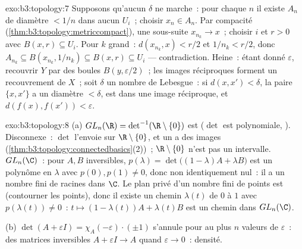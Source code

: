 \begin{solution}{exo:b3:topology:7}
Supposons qu'aucun $\delta$ ne marche~: pour chaque $n$ il
existe $A_n$ de diamètre $< 1/n$  dans aucun $U_i$~;
choisir $x_n \in A_n$. Par compacité
(\cref{thm:b3:topology:metriccompact}), une sous-suite
$x_{n_k} \to x$~; choisir $i$ et $r > 0$ avec $B(x, r)
\subseteq U_i$. Pour $k$ grand~: $d(x_{n_k}, x) < r/2$ et
$1/n_k < r/2$, donc $A_{n_k} \subseteq B(x_{n_k}, 1/n_k)
\subseteq B(x, r) \subseteq U_i$ --- contradiction. Heine~:
étant donné $\varepsilon$, recouvrir $Y$ par des boules
$B(y, \varepsilon/2)$~; les images réciproques forment un
recouvrement  de $X$~; soit $\delta$ un nombre de
Lebesgue~: si $d(x, x') < \delta$, la paire $\{x, x'\}$ a un
diamètre $< \delta$, est dans une image réciproque, et
$d(f(x), f(x')) < \varepsilon$.
\end{solution}

\begin{solution}{exo:b3:topology:8}
(a) $GL_n(\R) = \det^{-1}(\R\setminus\{0\})$ est 
($\det$ est polynomiale, ). Disconnexe~: $\det$
l'envoie sur $\R\setminus\{0\}$, et un  a des
images  
(\cref{thm:b3:topology:connectedbasics}(2))~;
$\R\setminus\{0\}$ n'est pas un intervalle. $GL_n(\C)$~: pour
$A, B$ inversibles, $p(\lambda) = \det\bigl((1-\lambda)A +
\lambda B\bigr)$ est un polynôme en $\lambda$ avec $p(0),
p(1) \neq 0$, donc non identiquement nul~: il a un nombre
fini de racines dans $\C$. Le plan privé d'un nombre fini de
points est  (contourner les points), donc il
existe un chemin $\lambda(t)$ de $0$ à $1$ avec
$p(\lambda(t)) \neq 0$~: $t \mapsto (1-\lambda(t))A +
\lambda(t)B$ est un chemin dans $GL_n(\C)$.

(b) $\det(A + \varepsilon I) = \chi_A(-\varepsilon)\cdot(\pm1)$
s'annule pour au plus $n$ valeurs de $\varepsilon$~: des
matrices inversibles $A + \varepsilon I \to A$ quand
$\varepsilon \to 0$~: densité.
\end{solution}

